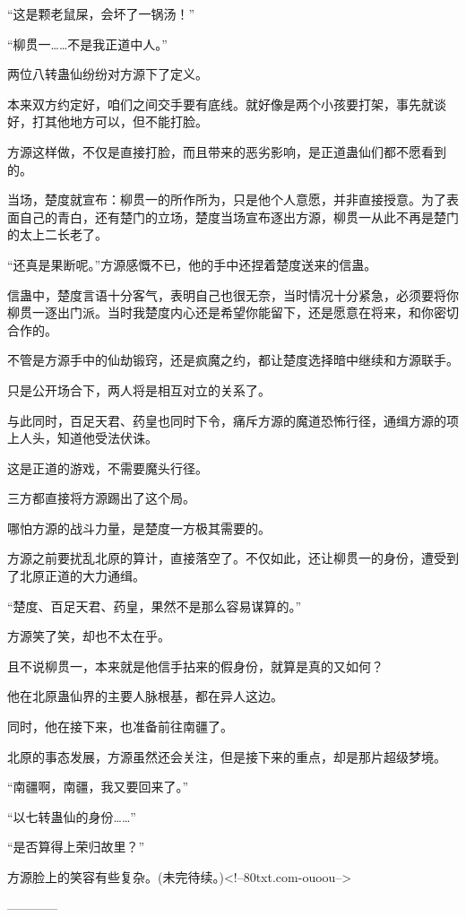 \begin{this_body}
“这是颗老鼠屎，会坏了一锅汤！”

“柳贯一……不是我正道中人。”

两位八转蛊仙纷纷对方源下了定义。

本来双方约定好，咱们之间交手要有底线。就好像是两个小孩要打架，事先就谈好，打其他地方可以，但不能打脸。

方源这样做，不仅是直接打脸，而且带来的恶劣影响，是正道蛊仙们都不愿看到的。

当场，楚度就宣布：柳贯一的所作所为，只是他个人意愿，并非直接授意。为了表面自己的青白，还有楚门的立场，楚度当场宣布逐出方源，柳贯一从此不再是楚门的太上二长老了。

“还真是果断呢。”方源感慨不已，他的手中还捏着楚度送来的信蛊。

信蛊中，楚度言语十分客气，表明自己也很无奈，当时情况十分紧急，必须要将你柳贯一逐出门派。当时我楚度内心还是希望你能留下，还是愿意在将来，和你密切合作的。

不管是方源手中的仙劫锻窍，还是疯魔之约，都让楚度选择暗中继续和方源联手。

只是公开场合下，两人将是相互对立的关系了。

与此同时，百足天君、药皇也同时下令，痛斥方源的魔道恐怖行径，通缉方源的项上人头，知道他受法伏诛。

这是正道的游戏，不需要魔头行径。

三方都直接将方源踢出了这个局。

哪怕方源的战斗力量，是楚度一方极其需要的。

方源之前要扰乱北原的算计，直接落空了。不仅如此，还让柳贯一的身份，遭受到了北原正道的大力通缉。

“楚度、百足天君、药皇，果然不是那么容易谋算的。”

方源笑了笑，却也不太在乎。

且不说柳贯一，本来就是他信手拈来的假身份，就算是真的又如何？

他在北原蛊仙界的主要人脉根基，都在异人这边。

同时，他在接下来，也准备前往南疆了。

北原的事态发展，方源虽然还会关注，但是接下来的重点，却是那片超级梦境。

“南疆啊，南疆，我又要回来了。”

“以七转蛊仙的身份……”

“是否算得上荣归故里？”

方源脸上的笑容有些复杂。(未完待续。)<!--80txt.com-ouoou-->

------------

\end{this_body}

